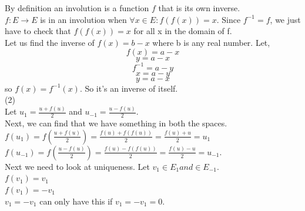 \documentclass[12pt]{article}
\begin{document}
By definition an involution is a function $f$ that is its own inverse. \\

$f: E \rightarrow E$ is in an involution when $\forall x \in E: f(f(x)) = x$. Since $f^{-1} = f$, we just have to check that $f(f(x)) =x$ for all x in the domain of f. \\

Let us find the inverse of $f(x) = b -x$ where b is any real number. Let,  
$$f(x) = a -x$$
$$y=a-x$$
$$f^{-1} = a - y $$
$$ x = a-y$$
$$y= a-x$$
so $f(x) = f^{-1}(x)$. So it's an inverse of itself. \\

\medskip
(2)\\

Let $u_1 = \frac{u + f(u)}{2}$ and $u_{-1} = \frac{u-f(u)}{2}$. \\

Next, we can find that we have something in both the spaces. 
$f(u_1) = f(\frac{u+f(u)}{2}) = \frac{f(u) + f(f(u))}{2} = \frac{f(u) + u}{2} = u_1$ \\
$f(u_{-1}) = f(\frac{u-f(u)}{2}) = \frac{f(u)-f(f(u))}{2} = \frac{f(u) - u}{2} = u_{-1}$. \\

Next we need to look at uniqueness. Let $v_1 \in E_1 and \in E_{-1}$. \\
$f(v_1) = v_1$ \\
$f(v_1) = -v_1$ \\
$v_1 = -v_1$ can only have this if $v_1 = -v_1 = 0$. 
\end{document}
